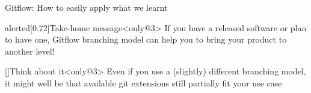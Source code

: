 \documentclass[usenames,svgnames,14pt]{beamer}
\begin{document}
\begin{frame}[fragile,c]{Gitflow: How to easily apply what we learnt}
\begin{overlayarea}{\textwidth}{0.7\textheight}
\begin{onlyenv}
        \end{onlyenv}
        \begin{varblock}{alerted}[0.72\textwidth]{Take-home message}<only@3>
            If you have a released software or plan to have one, Gitflow branching model can help you to bring your product to another level!
        \end{varblock}
        \begin{varblock}{}[\textwidth]{Think about it}<only@3>
            Even if you use a (slightly) different branching model, it might well be that available git extensions still partially fit your use case
        \end{varblock}
    \end{overlayarea}
\end{frame}


\end{document}
